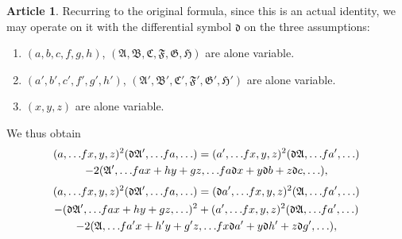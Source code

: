 \documentclass[12pt,a4paper]{article}
\theoremstyle{definition}
\newtheorem{art}{Article}[section]
\begin{document}
\begin{art}
Recurring to the original formula, since this is an actual identity, we may operate on it with the differential symbol $\mathfrak{d}$ on the three assumptions:
\begin{enumerate}[label=\arabic*.]
\item $(a, b, c, f, g, h)$, $(\mathfrak{A}, \mathfrak{B}, \mathfrak{C}, \mathfrak{F}, \mathfrak{G}, \mathfrak{H})$ are alone variable.
\item $(a', b', c', f', g', h')$, $(\mathfrak{A}', \mathfrak{B}', \mathfrak{C}', \mathfrak{F}', \mathfrak{G}', \mathfrak{H}')$ are alone variable.
\item $(x, y, z)$ are alone variable.
\end{enumerate}
We thus obtain
\begin{multline*}
(a, \ldots \hspace{-2pt} fx, y, z)^2(\mathfrak{d}\mathfrak{A}', \ldots \hspace{-2pt} fa, \ldots) = (a', \ldots \hspace{-2pt} fx, y, z)^2(\mathfrak{d}\mathfrak{A}, \ldots \hspace{-2pt} fa', \ldots) \\
- 2(\mathfrak{A}', \ldots \hspace{-2pt} fax + hy + gz, \ldots \hspace{-2pt} fa\mathfrak{d}x + y\mathfrak{d}b + z\mathfrak{d}c, \ldots),
\end{multline*}
\begin{multline*}
(a, \ldots \hspace{-2pt} fx, y, z)^2(\mathfrak{d}\mathfrak{A}', \ldots \hspace{-2pt} fa, \ldots) = (\mathfrak{d}a', \ldots \hspace{-2pt} fx, y, z)^2(\mathfrak{A}, \ldots \hspace{-2pt} fa', \ldots) \\
- (\mathfrak{d}\mathfrak{A}', \ldots \hspace{-2pt} fax + hy + gz, \ldots)^2 + (a', \ldots \hspace{-2pt} fx, y, z)^2(\mathfrak{d}\mathfrak{A}, \ldots \hspace{-2pt} fa', \ldots) \\
- 2(\mathfrak{A}, \ldots \hspace{-2pt} fa'x + h'y + g'z, \ldots \hspace{-2pt} fx\mathfrak{d}a' + y\mathfrak{d}h' + z\mathfrak{d}g', \ldots),
\end{multline*}

\end{art}
\end{document}
